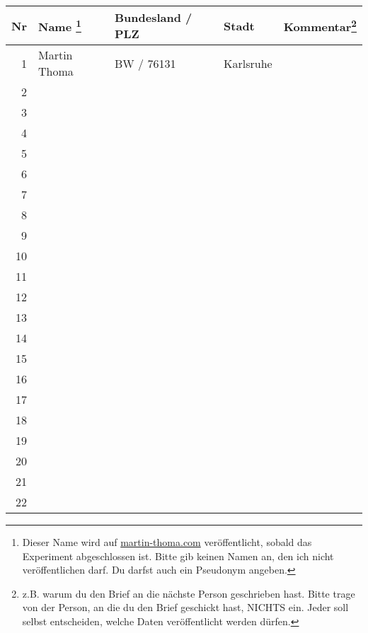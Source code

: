 \documentclass[11pt,a4paper,oneside,landscape]{scrartcl}
\begin{document}
\begin{minipage*}{6cm}
\begin{tabular}{r || p{5cm} | p{4cm} | p{5cm} | p{10cm}}
    Nr & Name \footnote{Dieser Name wird auf \href{http://martin-thoma.com}{martin-thoma.com} veröffentlicht, sobald das Experiment abgeschlossen ist. Bitte gib keinen Namen an, den ich nicht veröffentlichen darf. Du darfst auch ein Pseudonym angeben.}   & Bundesland / PLZ & Stadt & Kommentar\footnote{z.B. warum du den Brief an die nächste Person geschrieben hast. Bitte trage von der Person, an die du den Brief geschickt hast, NICHTS ein. Jeder soll selbst entscheiden, welche Daten veröffentlicht werden dürfen.}\\
    \hline
    \hline
1 & Martin Thoma & BW / 76131 & Karlsruhe\\
\hline
2 & & &\\
\hline
3 & & &\\
\hline
4 & & &\\
\hline
5 & & &\\
\hline
6 & & &\\
\hline
7 & & &\\
\hline
8 & & &\\
\hline
9 & & &\\
\hline
10 & & &\\
\hline
11 & & &\\
\hline
12 & & &\\
\hline
13 & & &\\
\hline
14 & & &\\
\hline
15 & & &\\
\hline
16 & & &\\
\hline
17 & & &\\
\hline
18 & & &\\
\hline
19 & & &\\
\hline
20 & & &\\
\hline
21 & & &\\
\hline
22 & & &\\
\hline
\end{tabular}
\end{minipage*}
\end{document}
